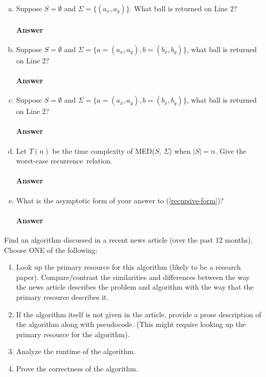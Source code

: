 \documentclass{article}
\begin{document}
\begin{enumerate}[(a)]
    \item
        Suppose $S=\emptyset$ and $\Sigma=\{ (a_x,a_y)\}$. What ball is returned on Line 2?
        \paragraph{Answer}
    \item
        Suppose $S=\emptyset$ and $\Sigma=\{ a=(a_x,a_y),b=(b_x,b_y)\}$, what ball is returned on Line 2?
        \paragraph{Answer}
    \item
        Suppose $S=\emptyset$ and $\Sigma=\{ a=(a_x,a_y),b=(b_x,b_y)\}$, what ball is returned on Line 2?
        \paragraph{Answer}

    \item Let $T(n)$ be the time complexity of MED($S$, $\Sigma$) when
        $|S|=n$.  Give the worst-case recurrence~relation.\label{recursive-form}
        \paragraph{Answer}
    \item What is the asymptotic form of your answer to (\ref{recursive-form})?
        \paragraph{Answer}
\end{enumerate}



Find an algorithm discussed in a recent news article (over the past 12 months).
Choose ONE of the following:
\begin{enumerate}
    \item Look up the primary resource for this algorithm (likely to be a
        research paper).  Compare/contrast the similarities and differences between the
        way the news article describes the problem and algorithm with the way
        that the primary resource describes it.
    \item If the algorithm itself is not given in the article, provide a prose
        description of the algorithm along with pseudocode. (This might require
        looking up the primary resource for the algorithm).
    \item Analyze the runtime of the algorithm.
    \item Prove the correctness of the algorithm.
\end{enumerate}
\end{document}

